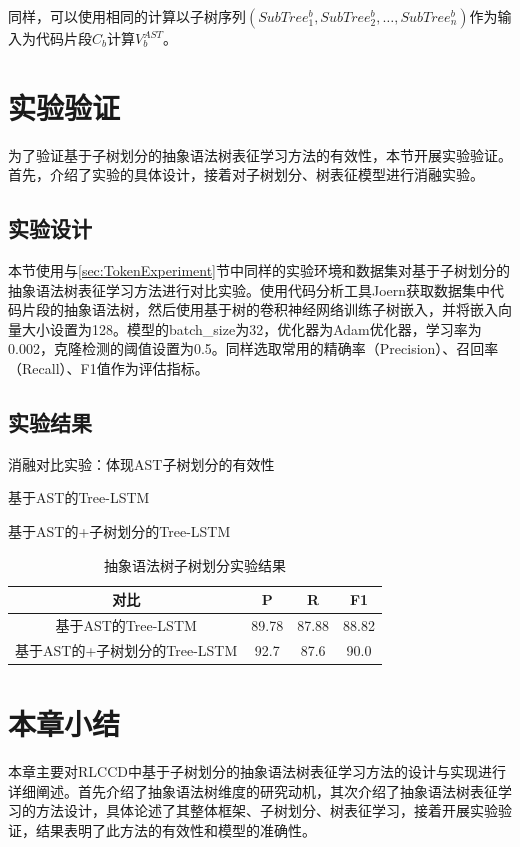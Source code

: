 同样，可以使用相同的计算以子树序列$\left(SubTree_{1}^{b},SubTree_{2}^{b},\ldots,SubTree_{n}^{b}\right)$作为输入为代码片段$C_{b}$计算$V_{b}^{AST}$。


\section{实验验证}
\label{sec:ASTExperiment}
为了验证基于子树划分的抽象语法树表征学习方法的有效性，本节开展实验验证。首先，介绍了实验的具体设计，接着对子树划分、树表征模型进行消融实验。

\subsection{实验设计}
\label{subsec:ASTDesign}

本节使用与\ref{sec:TokenExperiment}节中同样的实验环境和数据集对基于子树划分的抽象语法树表征学习方法进行对比实验。使用代码分析工具Joern获取数据集中代码片段的抽象语法树，然后使用基于树的卷积神经网络训练子树嵌入，并将嵌入向量大小设置为128。模型的batch\_size为32，优化器为Adam优化器，学习率为0.002，克隆检测的阈值设置为0.5。同样选取常用的精确率（Precision）、召回率（Recall）、F1值作为评估指标。

\subsection{实验结果}
\label{subsec:TokenResult}
消融对比实验：体现AST子树划分的有效性

基于AST的Tree-LSTM

基于AST的+子树划分的Tree-LSTM

\begin{table}
  \centering
  \caption{抽象语法树子树划分实验结果} %
  \begin{tabular*}{0.9\textwidth}{@{\extracolsep{\fill}}cccc}
  \toprule
    对比			&P		&R		&F1 \\
  \midrule
    基于AST的Tree-LSTM			&89.78	&87.88		&88.82 \\
    基于AST的+子树划分的Tree-LSTM			&92.7	&87.6		&90.0 \\
  \bottomrule
  \end{tabular*}
\end{table}

\section{本章小结}
\label{sec:Summary4}
本章主要对RLCCD中基于子树划分的抽象语法树表征学习方法的设计与实现进行详细阐述。首先介绍了抽象语法树维度的研究动机，其次介绍了抽象语法树表征学习的方法设计，具体论述了其整体框架、子树划分、树表征学习，接着开展实验验证，结果表明了此方法的有效性和模型的准确性。



